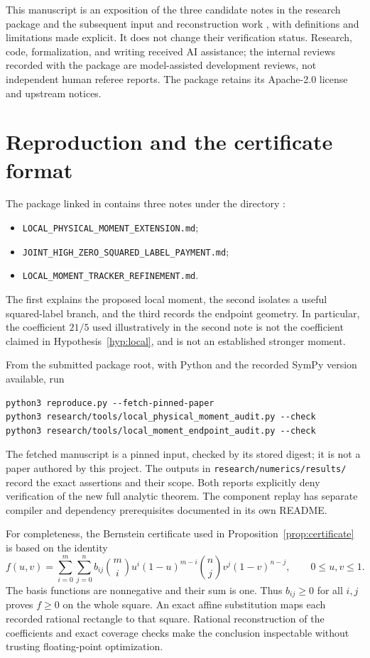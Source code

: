 \documentclass[11pt]{article}
\theoremstyle{definition}
\newcommand{\code}[1]{\texttt{\small #1}}
\begin{document}
This manuscript is an exposition of the three candidate notes in the
research package \cite{gao} and the subsequent input and reconstruction
work \cite{gaov2}, with definitions and limitations made
explicit. It does not change their verification status. Research,
code, formalization, and writing received AI assistance; the internal
reviews recorded with the package are model-assisted development
reviews, not independent human referee reports. The package retains its
Apache-2.0 license and upstream notices.

\appendix
\section{Reproduction and the certificate format}\label{app:reproduce}

The package linked in \cite{gao} contains three notes under the directory
:
\begin{itemize}
\item \code{LOCAL\_PHYSICAL\_MOMENT\_EXTENSION.md};
\item \code{JOINT\_HIGH\_ZERO\_SQUARED\_LABEL\_PAYMENT.md};
\item \code{LOCAL\_MOMENT\_TRACKER\_REFINEMENT.md}.
\end{itemize}
The first explains the proposed local moment, the second isolates a
useful squared-label branch, and the third records the endpoint
geometry. In particular, the coefficient $21/5$ used illustratively in
the second note is not the coefficient claimed in
Hypothesis~\ref{hyp:local}, and is not an established stronger moment.

From the submitted package root, with Python and the recorded SymPy
version available, run
\begin{verbatim}
python3 reproduce.py --fetch-pinned-paper
python3 research/tools/local_physical_moment_audit.py --check
python3 research/tools/local_moment_endpoint_audit.py --check
\end{verbatim}
The fetched manuscript is a pinned input, checked by its stored digest;
it is not a paper authored by this project. The outputs in
\code{research/numerics/results/} record the exact assertions and their
scope. Both reports explicitly deny verification of the new full
analytic theorem. The component replay has separate compiler and
dependency prerequisites documented in its own README.

For completeness, the Bernstein certificate used in
Proposition~\ref{prop:certificate} is based on the identity
\[
 f(u,v)=\sum_{i=0}^{m}\sum_{j=0}^{n}
 b_{ij}\binom mi u^i(1-u)^{m-i}\binom nj v^j(1-v)^{n-j},
 \qquad 0\le u,v\le1.
\]
The basis functions are nonnegative and their sum is one. Thus
$b_{ij}\ge0$ for all $i,j$ proves $f\ge0$ on the whole square.
An exact affine substitution maps each recorded rational rectangle to
that square. Rational reconstruction of the coefficients and exact
coverage checks make the conclusion inspectable without trusting
floating-point optimization.
\end{document}
